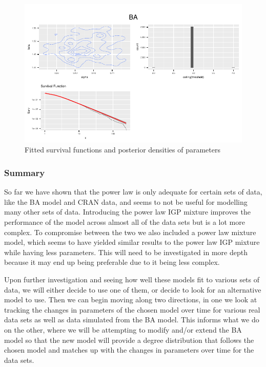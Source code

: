 \documentclass[
]{article}
\begin{document}
\begin{figure}
\begin{minipage}[t]{0.33\linewidth}
{\captionsetup{labelsep=none}\includegraphics{proposal_files/figure-pdf/fig-plpl-5.pdf}

}

\subcaption{\label{fig-plpl-5}}

\end{minipage}%

\caption{\label{fig-plpl}Fitted survival functions and posterior
densities of parameters}

\end{figure}%

\subsubsection{Summary}\label{summary}

So far we have shown that the power law is only adequate for certain
sets of data, like the BA model and CRAN data, and seems to not be
useful for modelling many other sets of data. Introducing the power law
IGP mixture improves the performance of the model across almost all of
the data sets but is a lot more complex. To compromise between the two
we also included a power law mixture model, which seems to have yielded
similar results to the power law IGP mixture while having less
parameters. This will need to be investigated in more depth because it
may end up being preferable due to it being less complex.

Upon further investigation and seeing how well these models fit to
various sets of data, we will either decide to use one of them, or
decide to look for an alternative model to use. Then we can begin moving
along two directions, in one we look at tracking the changes in
parameters of the chosen model over time for various real data sets as
well as data simulated from the BA model. This informs what we do on the
other, where we will be attempting to modify and/or extend the BA model
so that the new model will provide a degree distribution that follows
the chosen model and matches up with the changes in parameters over time
for the data sets.
\end{document}
